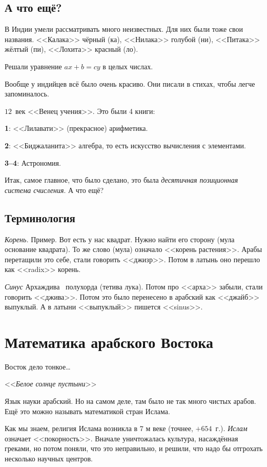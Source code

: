 \documentclass[a4paper,oneside,fleqn,10pt]{article}
\begin{document}
\subsection{А что ещё?}

В Индии умели рассматривать много неизвестных.  Для них были тоже свои
названия.  <<Калака>> чёрный (ка), <<Нилака>> голубой (ни), <<Питака>>
жёлтый (пи), <<Лохита>> красный (ло).

Решали уравнение $ax + b = cy$ в целых числах.

Вообще у индийцев всё было очень красиво. Они писали в стихах, чтобы
легче запоминалось.

$12$~век  
    <<Венец учения>>. Это были 4 книги:

\textbf{1}: <<Лилавати>> (прекрасное) арифметика.

\textbf{2}: <<Биджаланита>> алгебра, то есть искусство вычисления с
элементами.

\textbf{3--4}: Астрономия.

Итак, самое главное, что было сделано, это была \emph{десятичная
  позиционная система счисления}.  А что ещё?

\subsection{Терминология}

\emph{Корень.} Пример. Вот есть у нас квадрат. Нужно найти его сторону
(мула основание квадрата).  То же слово (мула) означало <<корень
растения>>. Арабы перетащили это себе, стали говорить <<джизр>>. Потом
в латынь оно перешло как <<radix>> корень.

\emph{Синус}  Архаждива~ полухорда (тетива лука).  Потом про <<арха>>
забыли, стали говорить <<джива>>.  Потом это было перенесено в
арабский как <<джайб>> выпуклый. А в латыни <<выпуклый>> пишется
<<sinus>>.

\section{Математика арабского Востока}

\epigraph{ Восток дело тонкое\ldots\hskip1cm} {<<\emph{Белое солнце
    пустыни}>>}

Язык науки арабский. Но на самом деле, там было не так много чистых
арабов. Ещё это можно называть математикой стран Ислама.

Как мы знаем, религия Ислама возникла в $7$ м веке (точнее,
$+654$~г.). \emph{Ислам} означает <<покорность>>.  Вначале
уничтожалась культура, насаждённая греками, но потом поняли, что это
неправильно, и решили, что надо бы отгрохать несколько научных
центров.
\end{document}

